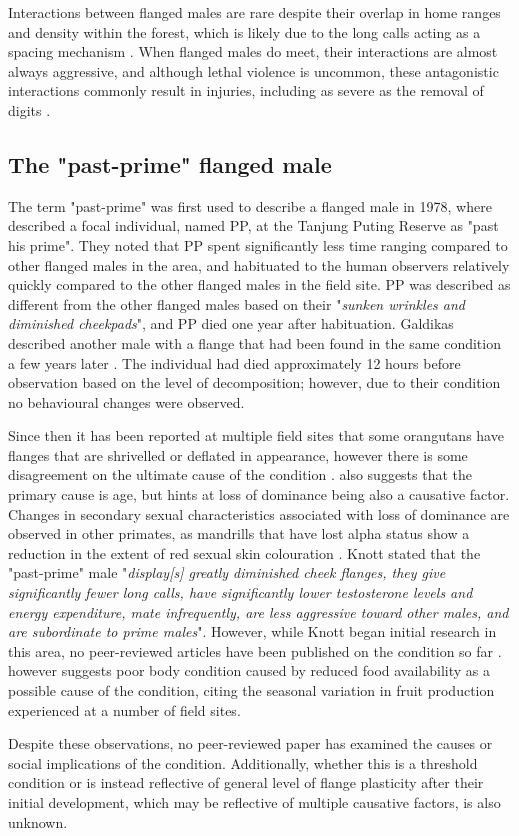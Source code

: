 Interactions between flanged males are rare despite their overlap in home ranges and density within the forest, which is likely due to the long calls acting as a spacing mechanism \citep{Spillmann.2016}. When flanged males do meet, their interactions are almost always aggressive, and although lethal violence is uncommon, these antagonistic interactions commonly result in injuries, including as severe as the removal of digits \citep{Setia.2008}.  

\subsection{The "past-prime" flanged male}
The term "past-prime" was first used to describe a flanged male in 1978, where \citet{Galdikas.1978} described a focal individual, named PP, at the Tanjung Puting Reserve as "past his prime". They noted that PP spent significantly less time ranging compared to other flanged males in the area, and habituated to the human observers relatively quickly compared to the other flanged males in the field site. PP was described as different from the other flanged males based on their "\textit{sunken wrinkles and diminished cheekpads}", and PP died one year after habituation. Galdikas described another male with a flange that had been found in the same condition a few years later \citep{Galdikas.1978}. The individual had died approximately 12 hours before observation based on the level of decomposition; however, due to their condition no behavioural changes were observed. 

Since then it has been reported at multiple field sites that some orangutans have flanges that are shrivelled or deflated in appearance, however there is some disagreement on the ultimate cause of the condition \citep{Knott.2009, Dunkel.2013}.  \citet{Knott.2009} also suggests that the primary cause is age, but hints at loss of dominance being also a causative factor. Changes in secondary sexual characteristics associated with loss of dominance are observed in other primates, as mandrills that have lost alpha status show a reduction in the extent of red sexual skin colouration \citep{Setchell.2001}. Knott stated that the "past-prime" male "\textit{display[s] greatly diminished cheek flanges, they give significantly fewer long calls, have significantly lower testosterone levels and energy expenditure, mate infrequently, are less aggressive toward other males, and are subordinate to prime males}". However, while Knott began initial research in this area, no peer-reviewed articles have been published on the condition so far \citep{Knott.2009b}.  \citet{Dunkel.2013} however suggests poor body condition caused by reduced food availability as a possible cause of the condition, citing the seasonal variation in fruit production experienced at a number of field sites. 

Despite these observations, no peer-reviewed paper has examined the causes or social implications of the condition. Additionally, whether this is a threshold condition or is instead reflective of general level of flange plasticity after their initial development, which may be reflective of multiple causative factors, is also unknown.